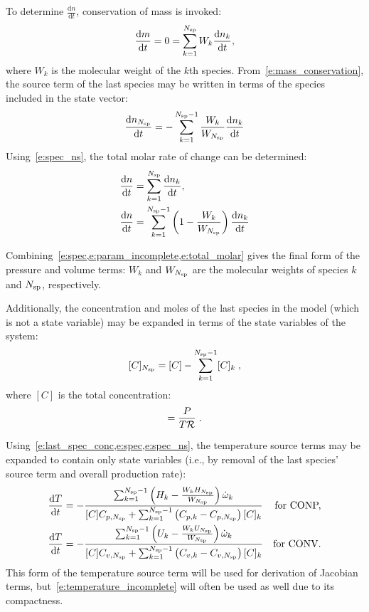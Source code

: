 \documentclass[12pt,number,sort&compress]{elsarticle}
\begin{document}
To determine $\frac{\text{d} n }{\text{d} t }$, conservation of mass is invoked:
\begin{equation}
 \label{e:mass_conservation}
 \frac{\text{d} m }{\text{d} t } = 0 = \sum_{k=1}^{\ns/}  W_{k} \frac{\text{d} n_{k} }{\text{d} t },
\end{equation}
where $W_{k}$ is the molecular weight of the $k$th species.
From~\cref{e:mass_conservation}, the source term of the last species may be written in terms of the species included in the state vector:
\begin{equation}
 \frac{\text{d} n_{\ns/} }{\text{d} t } = - \sum_{k=1}^{\ns/ - 1} \frac{W_{k}}{W_{\ns/}} \frac{\text{d} n_{k} }{\text{d} t }
 \label{e:spec_ns}
\end{equation}
Using~\cref{e:spec_ns}, the total molar rate of change can be determined:
\begin{align}
\frac{\text{d} n }{\text{d} t } &= \sum_{k=1}^{\ns/} \frac{\text{d} n_{k} }{\text{d} t }, \nonumber \\
\frac{\text{d} n }{\text{d} t } &= \sum_{k=1}^{\ns/ - 1} \left(1 - \frac{W_{k}}{W_{\ns/}}\right) \frac{\text{d} n_{k} }{\text{d} t }
\label{e:total_molar}
\end{align}

Combining~\cref{e:spec,e:param_incomplete,e:total_molar} gives the final form of the pressure and volume terms:
$W_{k}$ and $W_{\ns/}$ are the molecular weights of species $k$ and $\ns/$, respectively.

Additionally, the concentration and moles of the last species in the model (which is not a state variable) may be expanded in terms of the state variables of the system:
\begin{equation}
 \label{e:last_spec_conc}
   [C]_{\ns/} = [C] - \sum_{k=1}^{\ns/  - 1} [C]_{k}\;,
\end{equation}
where $[C]$ is the total concentration:
\begin{equation}
 [C] = \frac{P}{T \Ru/}\;.
\end{equation}

Using~\cref{e:last_spec_conc,e:spec,e:spec_ns}, the temperature source terms may be expanded to contain only state variables (i.e., by removal of the last species' source term and overall production rate):
\begin{subequations}
\label{e:temperature_complete}
\begin{align}
\frac{\text{d} T }{\text{d} t } &= - \frac{\sum_{k=1}^{\ns/  - 1} \left(H_{k} - \frac{W_{k} H_{\ns/}}{W_{\ns/}}\right) \dot{\omega}_{k}}{[C] {C_{p,\ns/}} + \sum_{k=1}^{\ns/  - 1} \left({C_{p, k}} - {C_{p,\ns/}}\right) [C]_{k}} &\text{\dconp/,}\\
\frac{\text{d} T }{\text{d} t } &= - \frac{\sum_{k=1}^{\ns/  - 1} \left(U_{k} - \frac{W_{k} U_{\ns/}}{W_{\ns/}}\right) \dot{\omega}_{k}}{[C] {C_{v,\ns/}} + \sum_{k=1}^{\ns/  - 1} \left({C_{v, k}} - {C_{v,\ns/}}\right) [C]_{k}} &\text{\dconv/.}
\end{align}
\end{subequations}
This form of the temperature source term will be used for derivation of Jacobian terms, but~\cref{e:temperature_incomplete} will often be used as well due to its compactness.
\end{document}

